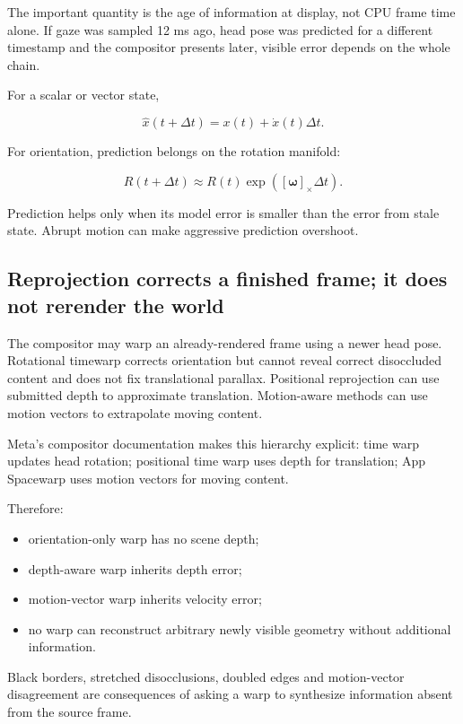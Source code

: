 The important quantity is the age of information at display, not CPU frame time alone. If gaze was sampled 12 ms ago, head pose was predicted for a different timestamp and the compositor presents later, visible error depends on the whole chain.

For a scalar or vector state,

\[
\hat{x}(t+\Delta t)=x(t)+\dot{x}(t)\Delta t.
\]

For orientation, prediction belongs on the rotation manifold:

\[
R(t+\Delta t)\approx R(t)\exp([\boldsymbol\omega]_\times\Delta t).
\]

Prediction helps only when its model error is smaller than the error from stale state. Abrupt motion can make aggressive prediction overshoot.

\subsection{Reprojection corrects a finished frame; it does not rerender the world}\label{reprojection-corrects-a-finished-frame-it-does-not-rerender-the-world}

The compositor may warp an already-rendered frame using a newer head pose. Rotational timewarp corrects orientation but cannot reveal correct disoccluded content and does not fix translational parallax. Positional reprojection can use submitted depth to approximate translation. Motion-aware methods can use motion vectors to extrapolate moving content.

Meta's compositor documentation makes this hierarchy explicit: time warp updates head rotation; positional time warp uses depth for translation; App Spacewarp uses motion vectors for moving content.

Therefore:

\begin{itemize}
\tightlist
\item
  orientation-only warp has no scene depth;
\item
  depth-aware warp inherits depth error;
\item
  motion-vector warp inherits velocity error;
\item
  no warp can reconstruct arbitrary newly visible geometry without additional information.
\end{itemize}

Black borders, stretched disocclusions, doubled edges and motion-vector disagreement are consequences of asking a warp to synthesize information absent from the source frame.

